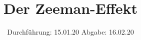 

\subject{V27}
\title{Der Zeeman-Effekt}
\date{%
  Durchführung: 15.01.20
  \hspace{3em}
  Abgabe: 16.02.20
}



\maketitle
\thispagestyle{empty}
\tableofcontents
\newpage







\printbibliography{}


